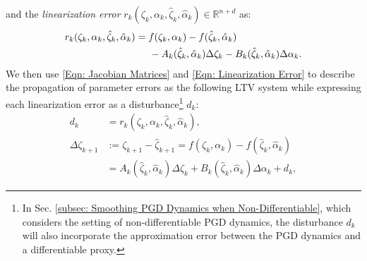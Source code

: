 \documentclass[letterpaper, 10 pt, conference]{ieeeconf}
\newcommand{\R}{\mathbb{R}}
\newcommand{\?}{\stackrel{?}{=}}
\newcommand{\param}{\theta}
\newcommand{\paramDim}{d}
\newcommand{\var}{\xi}
\newcommand{\varDim}{n}
\newcommand{\ratePGDNominal}{\hat\ratePGD}
\newcommand{\varError}{\Delta\var}
\newcommand{\paramError}{\Delta\param}
\newcommand{\ratePGDError}{\Delta\ratePGD}
\newcommand{\linearizationError}{r}
\newcommand{\disturbance}{d}
\newcommand{\ratePGD}{\alpha}
\newcommand{\jacobianState}{A}
\newcommand{\jacobianControl}{B}
\newcommand{\state}{\zeta}
\newcommand{\stateNominal}{\hat\state}
\newcommand{\stateError}{\Delta\state}
\newcommand{\dynamicsFullState}{f}
\newcommand{\frank}[1]{{\textcolor[rgb]{0,0,1}{\textsf{[Frank: {#1}]}}}}
\begin{document}
\hspace{-1mm}and the \textit{linearization error} $\linearizationError_k(\state_k, \ratePGD_k, \stateNominal_k, \ratePGDNominal_k) \in \R^{\varDim + \paramDim}$ as:
{
\setlength{\abovedisplayskip}{3.5pt}
\setlength{\belowdisplayskip}{3.5pt}
\begin{align}
\label{Eqn: Linearization Error}
    \linearizationError_k(\state_k, \ratePGD_k, \stateNominal_k, \ratePGDNominal_k) &= \dynamicsFullState(\state_k, \ratePGD_k) - \dynamicsFullState(\stateNominal_k, \ratePGDNominal_k) \\ \nonumber 
    &\hspace{5mm} - \jacobianState_k(\stateNominal_k, \ratePGDNominal_k) \stateError_k - \jacobianControl_k(\stateNominal_k, \ratePGDNominal_k) \ratePGDError_k.
\end{align}
}
\hspace{-2mm}We then use
\eqref{Eqn: Jacobian Matrices} and \eqref{Eqn: Linearization Error} to describe the propagation of parameter errors as the following LTV system
while expressing
each linearization error as a disturbance\footnote{
In Sec. \ref{subsec: Smoothing PGD Dynamics when Non-Differentiable}, which considers the setting of non-differentiable PGD dynamics, the disturbance $\disturbance_k$ will also incorporate the approximation error between the PGD dynamics and a differentiable proxy.
}
$\disturbance_k$:
{
\setlength{\abovedisplayskip}{3.5pt}
\setlength{\belowdisplayskip}{3.5pt}
\begin{align} \label{Eqn: Disturbance}
    \disturbance_k &= \linearizationError_k(\state_k, \ratePGD_k, \stateNominal_k, \ratePGDNominal_k), \\
    \nonumber
    \stateError_{k+1} &:= \state_{k+1} - \stateNominal_{k+1} = \dynamicsFullState(\state_k, \ratePGD_k) - \dynamicsFullState(\stateNominal_k, \ratePGDNominal_k) \\ \label{Eqn: State Error LTV Dynamics}
    &= \jacobianState_k(\stateNominal_k, \ratePGDNominal_k) \stateError_k + \jacobianControl_k(\stateNominal_k, \ratePGDNominal_k) \ratePGDError_k + \disturbance_k,
\end{align}
}
\end{document}
